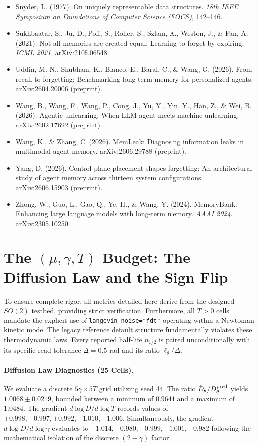 \documentclass{article}
\begin{document}
\begin{itemize}
\item Snyder, L. (1977). On uniquely representable data structures. \emph{18th IEEE Symposium on Foundations of Computer Science (FOCS)}, 142--146.
\item Sukhbaatar, S., Ju, D., Poff, S., Roller, S., Szlam, A., Weston, J., \& Fan, A. (2021). Not all memories are created equal: Learning to forget by expiring. \emph{ICML 2021}. arXiv:2105.06548.
\item Uddin, M. N., Shubham, K., Blanco, E., Baral, C., \& Wang, G. (2026). From recall to forgetting: Benchmarking long-term memory for personalized agents. arXiv:2604.20006 (preprint).
\item Wang, B., Wang, F., Wang, P., Cong, J., Yu, Y., Yin, Y., Han, Z., \& Wei, B. (2026). Agentic unlearning: When LLM agent meets machine unlearning. arXiv:2602.17692 (preprint).
\item Wang, K., \& Zhang, C. (2026). MemLeak: Diagnosing information leaks in multimodal agent memory. arXiv:2606.29788 (preprint).
\item Yang, D. (2026). Control-plane placement shapes forgetting: An architectural study of agent memory across thirteen system configurations. arXiv:2606.15903 (preprint).
\item Zhong, W., Guo, L., Gao, Q., Ye, H., \& Wang, Y. (2024). MemoryBank: Enhancing large language models with long-term memory. \emph{AAAI 2024}. arXiv:2305.10250.
\end{itemize}

\section{The $(\mu,\gamma,T)$ Budget: The Diffusion Law and the Sign Flip}\label{app:budget}

To ensure complete rigor, all metrics detailed here derive from the designed $SO(2)$ testbed, providing strict verification. Furthermore, all $T>0$ cells mandate the explicit use of \texttt{langevin\_noise="fdt"} operating within a Newtonian kinetic mode. The legacy reference default structure fundamentally violates these thermodynamic laws. Every reported half-life $n_{1/2}$ is paired unconditionally with its specific read tolerance $\Delta=0.5$ rad and its ratio $\ell_\theta/\Delta$.

\paragraph{Diffusion Law Diagnostics (25 Cells).} We evaluate a discrete $5\gamma\times5T$ grid utilizing seed 44. The ratio $\hat D_\theta/D_\theta^{\rm pred}$ yields $1.0068\pm0.0219$, bounded between a minimum of $0.9644$ and a maximum of $1.0484$. The gradient $d\log D/d\log T$ records values of $+0.998,+0.997,+0.992,+1.010,+1.006$. Simultaneously, the gradient $d\log D/d\log\gamma$ evaluates to $-1.014,-0.980,-0.999,-1.001,-0.982$ following the mathematical isolation of the discrete $(2-\gamma)$ factor.
\end{document}
